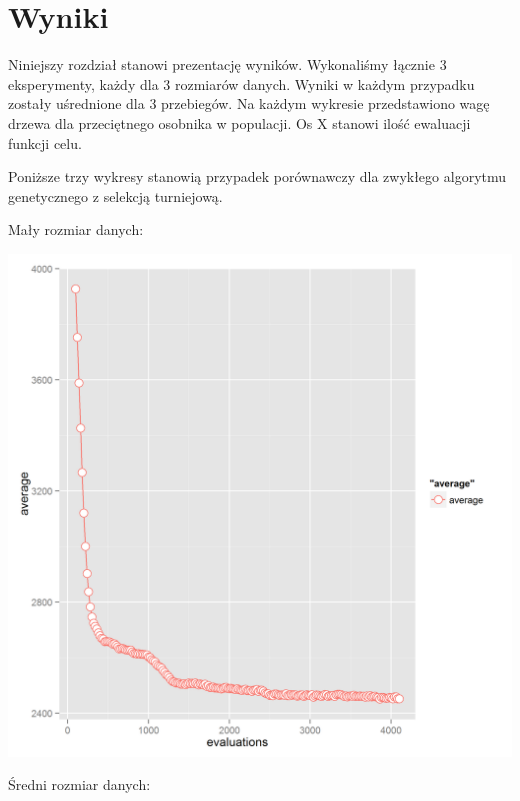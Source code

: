 \section*{Wyniki}

Niniejszy rozdział stanowi prezentację wyników. Wykonaliśmy łącznie 3 eksperymenty, każdy dla 3 rozmiarów danych. Wyniki w każdym przypadku zostały uśrednione dla 3 przebiegów. Na każdym wykresie przedstawiono wagę drzewa dla przeciętnego osobnika w populacji. Os X stanowi ilość ewaluacji funkcji celu.

Poniższe trzy wykresy stanowią przypadek porównawczy dla zwykłego algorytmu genetycznego z selekcją turniejową.

Mały rozmiar danych:

\includegraphics[]{simple_graph0.png}

Średni rozmiar danych:


